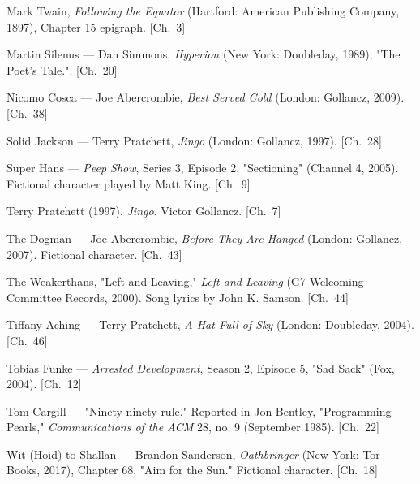 \begin{list}{}{%
  \setlength{\leftmargin}{2em}%
  \setlength{\itemindent}{-2em}%
  \setlength{\itemsep}{0.35\baselineskip}%
  \setlength{\parsep}{0pt}%
  \setlength{\topsep}{0.5em}}
\item Mark Twain, \textit{Following the Equator} (Hartford: American Publishing Company, 1897), Chapter 15 epigraph. \hfill {\scriptsize [Ch.~3]}
\item Martin Silenus — Dan Simmons, \textit{Hyperion} (New York: Doubleday, 1989), "The Poet's Tale.". \hfill {\scriptsize [Ch.~20]}
\item Nicomo Cosca — Joe Abercrombie, \textit{Best Served Cold} (London: Gollancz, 2009). \hfill {\scriptsize [Ch.~38]}
\item Solid Jackson — Terry Pratchett, \textit{Jingo} (London: Gollancz, 1997). \hfill {\scriptsize [Ch.~28]}
\item Super Hans — \textit{Peep Show}, Series 3, Episode 2, "Sectioning" (Channel 4, 2005). Fictional character played by Matt King. \hfill {\scriptsize [Ch.~9]}
\item Terry Pratchett (1997). \textit{Jingo}. Victor Gollancz. \hfill {\scriptsize [Ch.~7]}
\item The Dogman — Joe Abercrombie, \textit{Before They Are Hanged} (London: Gollancz, 2007). Fictional character. \hfill {\scriptsize [Ch.~43]}
\item The Weakerthans, "Left and Leaving," \textit{Left and Leaving} (G7 Welcoming Committee Records, 2000). Song lyrics by John K. Samson. \hfill {\scriptsize [Ch.~44]}
\item Tiffany Aching — Terry Pratchett, \textit{A Hat Full of Sky} (London: Doubleday, 2004). \hfill {\scriptsize [Ch.~46]}
\item Tobias Funke — \textit{Arrested Development}, Season 2, Episode 5, "Sad Sack" (Fox, 2004). \hfill {\scriptsize [Ch.~12]}
\item Tom Cargill — "Ninety-ninety rule." Reported in Jon Bentley, "Programming Pearls," \textit{Communications of the ACM} 28, no. 9 (September 1985). \hfill {\scriptsize [Ch.~22]}
\item Wit (Hoid) to Shallan — Brandon Sanderson, \textit{Oathbringer} (New York: Tor Books, 2017), Chapter 68, "Aim for the Sun." Fictional character. \hfill {\scriptsize [Ch.~18]}
\end{list}
\vspace{1em}

\endgroup